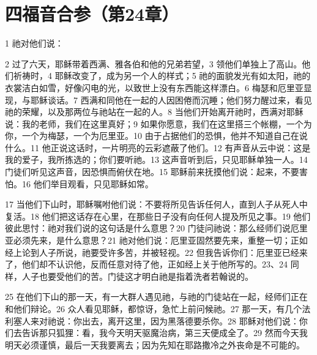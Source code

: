 \section{四福音合参（第24章）}

1 祂对他们说：\par

2 过了六天，耶稣带着西满、雅各伯和他的兄弟若望，3 领他们单独上了高山。他们祈祷时，4 耶稣改变了，成为另一个人的样式；5 祂的面貌发光有如太阳，祂的衣裳洁白如雪，好像闪电的光，以致世上没有东西能这样漂白。6 梅瑟和厄里亚显现，与耶稣谈话。7 西满和同他在一起的人因困倦而沉睡；他们努力醒过来，看见祂的荣耀，以及那两位与祂站在一起的人。8 当他们开始离开祂时，西满对耶稣说：我的老师，我们在这里真好；9 如果你愿意，我们在这里搭三个帐棚，一个为你，一个为梅瑟，一个为厄里亚。10 由于占据他们的恐惧，他并不知道自己在说什么。11 他正说这话时，一片明亮的云彩遮蔽了他们。12 有声音从云中说：这是我的爱子，我所拣选的；你们要听祂。13 这声音听到后，只见耶稣单独一人。14 门徒们听见这声音，因恐惧而俯伏在地。15 耶稣前来抚摸他们说：起来，不要害怕。16 他们举目观看，只见耶稣如常。\par

17 当他们下山时，耶稣嘱咐他们说：不要将所见告诉任何人，直到人子从死人中复活。18 他们把这话存在心里，在那些日子没有向任何人提及所见之事。19 他们彼此思忖：祂对我们说的这句话是什么意思？20 门徒问祂说：那么经师们说厄里亚必须先来，是什么意思？21 祂对他们说：厄里亚固然要先来，重整一切；正如经上论到人子所说，祂要受许多苦，并被轻视。22 但我告诉你们：厄里亚已经来了，他们却不认识他，反而任意对待了他，正如经上关于他所写的。23、24 同样，人子也要受他们的苦。门徒这才明白祂是指着洗者若翰说的。\par

25 在他们下山的那一天，有一大群人遇见祂，与祂的门徒站在一起，经师们正在和他们辩论。26 众人看见耶稣，都惊讶，急忙上前问候祂。27 那一天，有几个法利塞人来对祂说：你出去，离开这里，因为黑落德要杀你。28 耶稣对他们说：你们去告诉那只狐狸：看，我今天明天驱魔治病，第三天便成全了。29 然而今天我明天必须谨慎，最后一天我要离去；因为先知在耶路撒冷之外丧命是不可能的。\par

